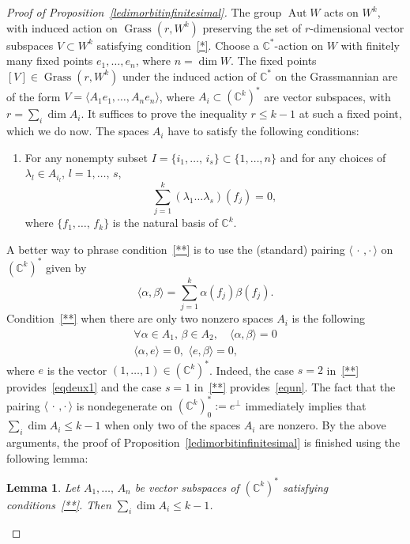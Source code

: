 \documentclass[11pt]{article}
\newtheorem{lemm}[theo]{Lemma}
\theoremstyle{definition}
\numberwithin{equation}{section}
\numberwithin{figure}{section}
\numberwithin{table}{section}
\DeclareMathOperator{\Aut}{Aut}
\DeclareMathOperator{\Grass}{Grass}
\let\oldforall\forall
\renewcommand*{\forall}{\mathrel{\oldforall}}
\begin{document}
\begin{proof}[Proof of Proposition~\ref{ledimorbitinfinitesimal}]
The group $\Aut W$ acts on $W^k$, with induced action on $\Grass(r,W^k)$ preserving the set of $r$-dimensional vector subspaces $V\subset W^k$ satisfying condition~\eqref{*}. Choose a $\mathbb{C}^*$-action on ${W}$ with finitely many fixed points $e_1,\dots, e_n$, where $n=\dim W$. The fixed points $[V]\in \Grass(r,W^k)$ under the induced action of $\mathbb{C}^*$ on the Grassmannian are of the form $V=\langle A_1e_1,\dots, A_n e_n\rangle$, where $A_i\subset (\mathbb{C}^k)^*$ are vector subspaces, with $r=\sum_i\dim A_i$. It suffices to prove the inequality $r\leq k-1$ at such a fixed point, which we do now. The spaces $A_i$ have to satisfy the following conditions:
\begin{enumerate}
\renewcommand{\theenumi}{$\ast\ast$}
\item \label{**}
For any nonempty subset $I=\{i_1,\dots,\,i_s\}\subset \{1,\dots,n\}$ and for any choices of $\lambda_l\in A_{i_l}$, $l=1,\dots,\,s$,
\[
\sum_{j=1}^k(\lambda_1\dots\lambda_s)(f_j)=0,
\]
where $\{f_1,\dots, \,f_k\}$ is the natural basis of $\mathbb{C}^k$.
\end{enumerate}

A better way to phrase condition~\eqref{**} is to use the (standard) pairing $\langle\,\cdot\,,\cdot\,\rangle$ on $(\mathbb{C}^k)^*$ given by
\[
\langle \alpha,\beta\rangle=\sum_{j=1}^k\alpha(f_j)\beta(f_j).
\]
Condition~\eqref{**} when there are only two nonzero spaces $A_i$ is the following
\begin{align}\label{eqdeux1}
\forall \alpha\in A_1,\,\beta\in A_2,\,\,\,\,\,\, \langle\alpha,\beta\rangle=0\\\label{equn}
\langle \alpha,e\rangle=0,\,\,\langle e,\beta\rangle=0,
\end{align}
where $e$ is the vector $(1,\dots,1)\in (\mathbb{C}^k)^*$. Indeed, the case $s=2$ in~\eqref{**} provides~\eqref{eqdeux1} and the case $s=1$ in~\eqref{**} provides~\eqref{equn}. The fact that the pairing $\langle\,\cdot\,,\cdot\,\rangle$ is nondegenerate on $(\mathbb{C}^k)^*_0:=e^{\perp}$ immediately implies that $\sum_i\dim A_i\leq k-1$ when only two of the spaces $A_i$ are nonzero. By the above arguments, the proof of Proposition~\ref{ledimorbitinfinitesimal} is finished using the following lemma:

\begin{lemm}\label{lepourproduitdeformes}
Let $A_1,\dots,\,A_n$ be vector subspaces of
$(\mathbb{C}^k)^*$ satisfying conditions~\eqref{**}. Then $\sum_i\dim A_i\leq k-1$.
\end{lemm}


\end{proof}
\end{document}
